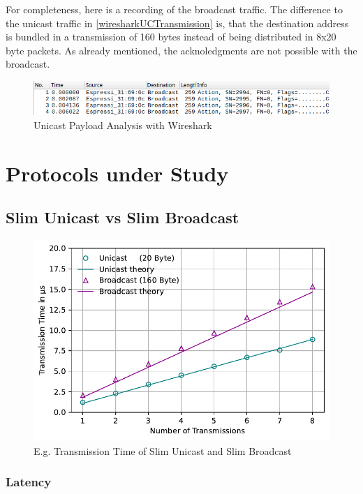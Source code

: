 For completeness, here is a recording of the broadcast traffic.
The difference to the unicast traffic in \cref{wiresharkUCTransmission} is,
that the destination address is bundled in a transmission of 160 bytes instead of being distributed in 8x20 byte packets.
As already mentioned, the acknoledgments are not possible with the broadcast.

\begin{figure}[h]
	\centering
	\includegraphics[scale=0.5]{figures/wiresharkBC.png}
	\caption{Unicast Payload Analysis with Wireshark}
	\label{fig:wiresharkBCTransmission}
\end{figure}

\section{Protocols under Study}

\subsection*{Slim Unicast vs Slim Broadcast}

\begin{figure}[h]
	\centering
	\includegraphics[scale=0.6]{../Plot2/Graphs/bc_uc_transmissiontime_wireshark.pdf}
	\caption{E.g. Transmission Time of Slim Unicast and Slim Broadcast}
	\label{fig:transmissionTime}
\end{figure}

\subsubsection{Latency}

